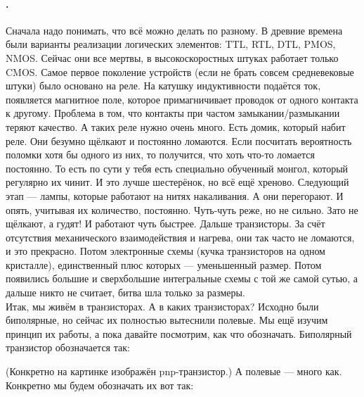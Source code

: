 \documentclass{article}
\begin{document}
    \paragraph{.}
    Сначала надо понимать, что всё можно делать по разному. В древние времена были варианты реализации логических элементов: TTL, RTL, DTL, PMOS, NMOS. Сейчас они все мертвы, в высокоскоростных штуках работает только CMOS. Самое первое поколение устройств (если не брать совсем средневековые штуки) было основано на реле. На катушку индуктивности подаётся ток, появляется магнитное поле, которое примагничивает проводок от одного контакта к другому. Проблема в том, что контакты при частом замыкании/размыкании теряют качество. А таких реле нужно очень много. Есть домик, который набит реле. Они безумно щёлкают и постоянно ломаются. Если посчитать вероятность поломки хотя бы одного из них, то получится, что хоть что-то ломается постоянно. То есть по сути у тебя есть специально обученный монгол, который регулярно их чинит. И это лучше шестерёнок, но всё ещё хреново.
    Следующий этап --- лампы, которые работают на нитях накаливания. А они перегорают. И опять, учитывая их количество, постоянно. Чуть-чуть реже, но не сильно. Зато не щёлкают, а гудят! И работают чуть быстрее.
    Дальше транзисторы. За счёт отсутствия механического взаимодействия и нагрева, они так часто не ломаются, и это прекрасно.
    Потом электронные схемы (кучка транзисторов на одном кристалле), единственный плюс которых --- уменьшенный размер. Потом появились большие и сверхбольшие интегральные схемы с той же самой сутью, а дальше никто не считает, битва шла только за размеры.\\
    Итак, мы живём в транзисторах. А в каких транзисторах? Исходно были биполярные, но сейчас их полностью вытеснили полевые. Мы ещё изучим принцип их работы, а пока давайте посмотрим, как что обозначать. Биполярный транзистор обозначается так:
    \begin{center}
    \end{center}
    (Конкретно на картинке изображён pnp-транзистор.) А полевые --- много как. Конкретно мы будем обозначать их вот так:
\end{document}
